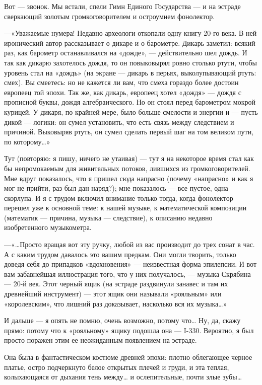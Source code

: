 \documentclass[11pt,openany]{book}
\begin{document}
Вот --- звонок. Мы встали, спели Гимн Единого Государства --- и на эстраде сверкающий золотым громкоговорителем и остроумием фонолектор.

---«Уважаемые нумера! Недавно археологи откопали одну книгу 20-го века. В ней иронический автор рассказывает о дикаре и о барометре. Дикарь заметил: всякий раз, как барометр останавливался на «дожде», --- действительно шел дождь. И так как дикарю захотелось дождя, то он повыковырял ровно столько ртути, чтобы уровень стал на «дождь» (на экране --- дикарь в перьях, выколупывающий ртуть: смех). Вы смеетесь: но не кажется ли вам, что смеха гораздо более достоин европеец той эпохи. Так же, как дикарь, европеец хотел «дождя» --- дождя с прописной буквы, дождя алгебраического. Но он стоял перед барометром мокрой курицей. У дикаря, по крайней мере, было больше смелости и энергии и --- пусть дикой --- логики: он сумел установить, что есть связь между следствием и причиной. Выковыряв ртуть, он сумел сделать первый шаг на том великом пути, по которому\ldots{}»

Тут (повторяю: я пишу, ничего не утаивая) --- тут я на некоторое время стал как бы непромокаемым для живительных потоков, лившихся из громкоговорителей. Мне вдруг показалось, что я пришел сюда напрасно (почему «напрасно» и как я мог не прийти, раз был дан наряд?); мне показалось --- все пустое, одна скорлупа. И я с трудом включил внимание только тогда, когда фонолектор перешел уже к основной теме: к нашей музыке, к математической композиции (математик --- причина, музыка --- следствие), к описанию недавно изобретенного музыкометра.

---«\ldots{}Просто вращая вот эту ручку, любой из вас производит до трех сонат в час. А с каким трудом давалось это вашим предкам. Они могли творить, только доведя себя до припадков «вдохновения» --- неизвестная форма эпилепсии. И вот вам забавнейшая иллюстрация того, что у них получалось, --- музыка Скрябина --- 20-й век. Этот черный ящик (на эстраде раздвинули занавес и там их древнейший инструмент) --- этот ящик они называли «рояльным» или «королевским», что лишний раз доказывает, насколько вся их музыка\ldots{}»

И дальше --- я опять не помню, очень возможно, потому что\ldots{} Ну, да, скажу прямо: потому что к «рояльному» ящику подошла она --- I-330. Вероятно, я был просто поражен этим ее неожиданным появлением на эстраде.

Она была в фантастическом костюме древней эпохи: плотно облегающее черное платье, остро подчеркнуто белое открытых плечей и груди, и эта теплая, колыхающаяся от дыхания тень между\ldots{} и ослепительные, почти злые зубы\ldots{}
\end{document}
